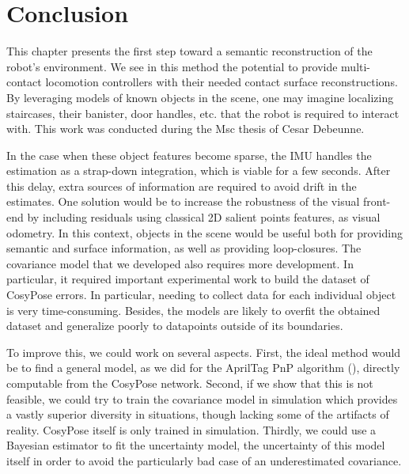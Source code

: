\section{Conclusion}

This chapter presents the first step toward a semantic reconstruction of the robot's environment. We see in this method the potential to provide multi-contact locomotion controllers \cite{carpentier2017multi}
with their needed contact surface reconstructions. By leveraging models of known objects in the scene, one may imagine localizing staircases, their banister, door handles, etc. that
the robot is required to interact with. This work was conducted during the Msc thesis of Cesar Debeunne.

In the case when these object features become sparse, the IMU handles the estimation as a strap-down integration, which is viable for a few seconds. After this delay, extra sources of information are required
to avoid drift in the estimates. One solution would be to increase the robustness of the visual front-end by including residuals using classical 2D salient points features, as visual odometry. In this context,
objects in the scene would be useful both for providing semantic and surface information, as well as providing loop-closures. The covariance model that we developed also requires more development.
In particular, it required important experimental work to build the dataset of CosyPose errors. In particular, needing to collect data for each individual object is very time-consuming. Besides,
the models are likely to overfit the obtained dataset and generalize poorly to datapoints outside of its boundaries.

To improve this, we could work on several aspects. First, the ideal method would be to find a general model, as we did for the AprilTag PnP algorithm (), directly computable
from the CosyPose network. Second, if we show that this is not feasible, we could try to train the covariance model in simulation which provides a vastly superior diversity in situations, though lacking
some of the artifacts of reality. CosyPose itself is only trained in simulation. Thirdly, we could use a Bayesian estimator to fit the uncertainty model, the uncertainty of this model itself in order to 
avoid the particularly bad case of an underestimated covariance. 